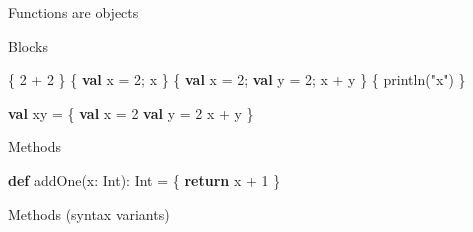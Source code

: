 \documentclass[ignorenonframetext,]{beamer}
\newenvironment{Shaded}{\begin{snugshade}}{\end{snugshade}}
\newcommand{\KeywordTok}[1]{\textcolor[rgb]{0.13,0.29,0.53}{\textbf{#1}}}
\newcommand{\DecValTok}[1]{\textcolor[rgb]{0.00,0.00,0.81}{#1}}
\newcommand{\StringTok}[1]{\textcolor[rgb]{0.31,0.60,0.02}{#1}}
\newcommand{\FunctionTok}[1]{\textcolor[rgb]{0.00,0.00,0.00}{#1}}
\newcommand{\NormalTok}[1]{#1}
\begin{document}
\begin{frame}[fragile]
\begin{block}{Functions are objects}
\end{block}

\begin{block}{Blocks}

\begin{Shaded}
\begin{Highlighting}[]
\NormalTok{\{ }\DecValTok{2}\NormalTok{ + }\DecValTok{2}\NormalTok{ \}}
\NormalTok{\{ }\KeywordTok{val}\NormalTok{ x = }\DecValTok{2}\NormalTok{; x \}}
\NormalTok{\{ }\KeywordTok{val}\NormalTok{ x = }\DecValTok{2}\NormalTok{; }\KeywordTok{val}\NormalTok{ y = }\DecValTok{2}\NormalTok{; x + y \}}
\NormalTok{\{ }\FunctionTok{println}\NormalTok{(}\StringTok{"x"}\NormalTok{) \}}
\end{Highlighting}
\end{Shaded}

\begin{Shaded}
\begin{Highlighting}[]
\KeywordTok{val}\NormalTok{ xy = \{ }
  \KeywordTok{val}\NormalTok{ x = }\DecValTok{2}
  \KeywordTok{val}\NormalTok{ y = }\DecValTok{2}
\NormalTok{  x + y}
\NormalTok{\}}
\end{Highlighting}
\end{Shaded}

\begin{Shaded}
\end{Shaded}

\end{block}

\begin{block}{Methods}

\begin{Shaded}
\begin{Highlighting}[]
\KeywordTok{def} \FunctionTok{addOne}\NormalTok{(x: Int): Int = \{}
    \KeywordTok{return}\NormalTok{ x + }\DecValTok{1}
\NormalTok{\}}
\end{Highlighting}
\end{Shaded}

\end{block}

\begin{block}{Methods (syntax variants)}


\end{block}
\end{frame}
\end{document}
